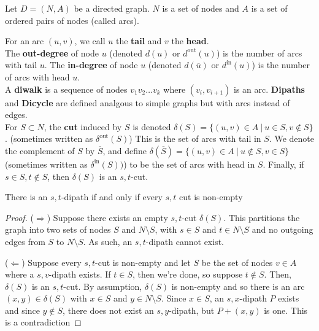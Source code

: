 \documentclass[../main.tex]{subfiles}
\begin{document}
Let $D = (N, A)$ be a directed graph. $N$ is a set of nodes and $A$ is a set of ordered pairs of nodes (called arcs).

\begin{definition}{}{}
  For an arc $(u,v)$, we call $u$ the \textbf{tail} and $v$ the \textbf{head}. \\

  The \textbf{out-degree} of node $u$ (denoted $d(u)$ or $d^{\text{out}}(u)$) is the number of arcs with tail $u$. The \textbf{in-degree} of node $u$ (denoted $d(\overline{u})$ or $d^{\text{in}}(u)$) is the number of arcs with head $u$. \\

  A \textbf{diwalk} is a sequence of nodes $v_1v_2\ldots v_k$ where $(v_i, v_{i+1})$ is an arc. \textbf{Dipaths} and \textbf{Dicycle} are defined analgous to simple graphs but with arcs instead of edges. \\

  For $S \subset N$, the \textbf{cut} induced by $S$ is denoted $\delta(S) = \{ (u,v) \in A \:\rvert\: u \in S, v \not\in S \}$. (sometimes written as $\delta^{\text{out}}(S)$) This is the set of arcs with tail in $S$.
  We denote the complement of $S$ by $\overline{S}$, and define $\delta(\overline{S}) = \{ (u,v) \in A \:\rvert\: u \not\in S, v \in S \}$ (sometimes written as $\delta^{\text{in}}(S))$) to be the set of arcs with head in $S$. Finally, if $s \in S, t \not\in S$, then $\delta(S)$ is an $s,t$-cut.
\end{definition}

\begin{theorem}{}{}
  There is an $s,t$-dipath if and only if every $s,t$ cut is non-empty
\end{theorem}
\begin{proof}
($\Rightarrow$) Suppose there exists an empty $s,t$-cut $\delta(S)$. This partitions the graph into two sets of nodes $S$ and $N\setminus S$, with $s \in S$ and $t \in N\setminus S$ and no outgoing edges from $S$ to $N\setminus S$. As such, an $s,t$-dipath cannot exist.

($\Leftarrow$) Suppose every $s,t$-cut is non-empty and let $S$ be the set of nodes $v \in A$ where a $s,v$-dipath exists. If $t \in S$, then we're done, so suppose $t \not\in S$. Then, $\delta(S)$ is an $s,t$-cut.
By assumption, $\delta(S)$ is non-empty and so there is an arc $(x,y) \in \delta(S)$ with $x \in S$ and $y \in N\setminus S$.
Since $x \in S$, an $s,x$-dipath $P$ exists and since $y \not\in S$, there does not exist an $s,y$-dipath, but $P + (x,y)$ is one. This is a contradiction
\end{proof}
\end{document}
